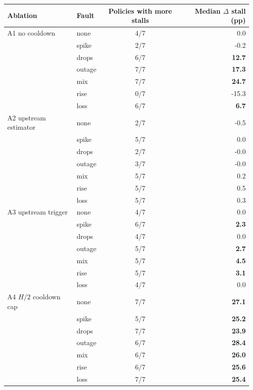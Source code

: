 \begin{tabular}{l l c r}
\toprule
Ablation & Fault & Policies with more stalls & Median $\Delta$ stall (pp) \\
\midrule
A1 no cooldown & none & 4/7 & 0.0 \\
 & spike & 2/7 & -0.2 \\
 & drops & 6/7 & \textbf{12.7} \\
 & outage & 7/7 & \textbf{17.3} \\
 & mix & 7/7 & \textbf{24.7} \\
 & rise & 0/7 & -15.3 \\
 & loss & 6/7 & \textbf{6.7} \\
\addlinespace
A2 upstream estimator & none & 2/7 & -0.5 \\
 & spike & 5/7 & 0.0 \\
 & drops & 2/7 & -0.0 \\
 & outage & 3/7 & -0.0 \\
 & mix & 5/7 & 0.2 \\
 & rise & 5/7 & 0.5 \\
 & loss & 5/7 & 0.3 \\
\addlinespace
A3 upstream trigger & none & 4/7 & 0.0 \\
 & spike & 6/7 & \textbf{2.3} \\
 & drops & 4/7 & 0.0 \\
 & outage & 5/7 & \textbf{2.7} \\
 & mix & 5/7 & \textbf{4.5} \\
 & rise & 5/7 & \textbf{3.1} \\
 & loss & 4/7 & 0.0 \\
\addlinespace
A4 $H/2$ cooldown cap & none & 7/7 & \textbf{27.1} \\
 & spike & 5/7 & \textbf{25.2} \\
 & drops & 7/7 & \textbf{23.9} \\
 & outage & 6/7 & \textbf{28.4} \\
 & mix & 6/7 & \textbf{26.0} \\
 & rise & 6/7 & \textbf{25.6} \\
 & loss & 7/7 & \textbf{25.4} \\
\bottomrule
\end{tabular}
